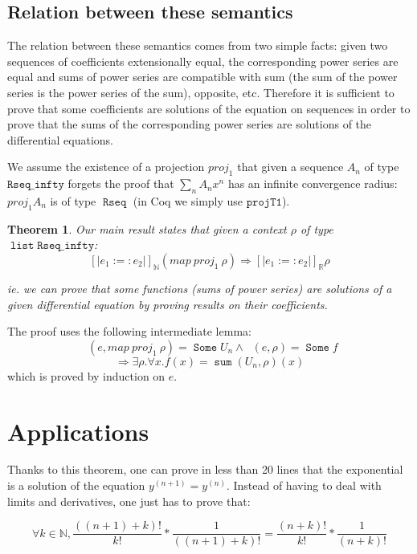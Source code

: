 \documentclass{article}
\newcommand{\coq}{Coq}
\newcommand{\N}{\mathbb{N}}
\newcommand{\R}{\mathbb{R}}
\DeclareMathOperator{\Some}{\mathtt{Some}}
\DeclareMathOperator{\Rseq}{\mathtt{Rseq}}
\DeclareMathOperator{\alist}{\mathtt{list}}
\DeclareMathOperator{\Interp}{\mathtt{interp}}
\DeclareMathOperator{\IR}{\Interp_{\R}}
\DeclareMathOperator{\IN}{\Interp_{\N}}
\DeclareMathOperator{\Psum}{\mathtt{sum}}
\newtheorem{theorem}{Theorem}
\newenvironment{proof}[1][Proof]{\begin{trivlist}
\item[\hskip \labelsep {\bfseries #1}]}{\end{trivlist}}
\begin{document}
\subsection{Relation between these semantics}

The relation between these semantics comes from two simple facts: given two
sequences of coefficients extensionally equal, the corresponding power
series are equal and sums of power series are compatible with sum (the sum
of the power series is the power series of the sum), opposite, etc.
Therefore it is sufficient to prove that some coefficients are solutions of
the equation on sequences in order to prove that the sums of the corresponding
power series are solutions of the differential equations.


We assume the existence of a projection $proj_1$ that given a sequence $A_n$ of
type $\mathtt{Rseq\_infty}$ forgets the proof that $\sum_n A_n x^n$ has an
infinite convergence radius: $proj_1 A_n$ is of type $\Rseq{}$ (in \coq{} we
simply use $\mathtt{projT1}$).

\begin{theorem}Our main result states that given a context
$\rho$ of type $\alist{} \mathtt{Rseq\_infty}$:
$$\left[\left| e_1 :=: e_2 \right|\right]_\N (map ~ proj_1 ~ \rho) \Rightarrow
\left[\left| e_1 :=: e_2 \right|\right]_\R \rho$$

ie. we can prove that some functions (sums of power series) are solutions
of a given differential equation by proving results on their coefficients.
\end{theorem}

\begin{proof} The proof uses the following intermediate lemma:
$$\IN(e, map ~ proj_1 ~ \rho) = \Some U_n \wedge \IR(e, \rho) = \Some f$$
$$\Rightarrow \exists \rho. \forall x. f(x) = \Psum{}(U_n, \rho)(x)$$
which is proved by induction on $e$.

\end{proof}

\section{Applications}

Thanks to this theorem, one can prove in less than 20 lines that the
exponential is a solution of the equation $y^{(n+1)} = y^{(n)}$. Instead
of having to deal with limits and derivatives, one just has to prove that:

$$\forall k \in \N, \frac{((n+1) + k)!}{k!} * \frac{1}{((n+1)+k)!}
= \frac{(n+k)!}{k!} * \frac{1}{(n+k)!}$$
\end{document}
